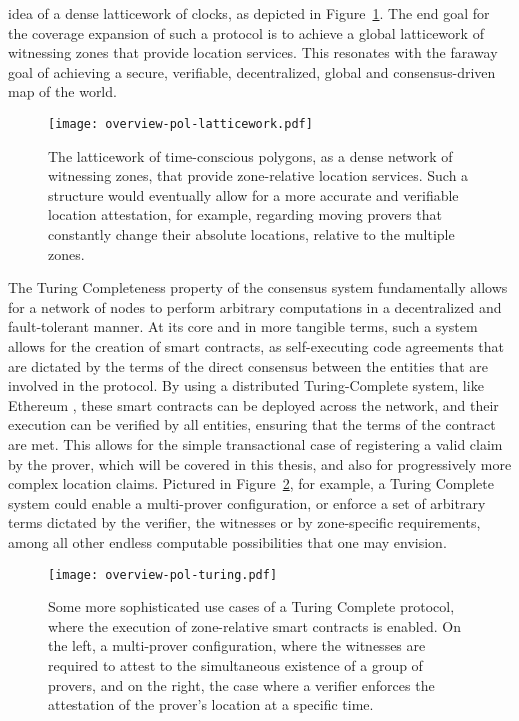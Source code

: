 idea of a dense latticework of clocks, as depicted in Figure~\ref{fig:proof-of-location-overview-latticework}. The end goal for the coverage expansion of such a \pol{} protocol is to achieve a global latticework of witnessing zones that provide location services. This resonates with the faraway goal of achieving a secure, verifiable, decentralized, global and consensus-driven map of the world.

\begin{figure}[ht]
    \begin{center}
    \texttt{[image: overview-pol-latticework.pdf]}
    \caption{The latticework of time-conscious polygons, as a dense network of witnessing zones, that provide zone-relative location services. Such a structure would eventually allow for a more accurate and verifiable location attestation, for example, regarding moving provers that constantly change their absolute locations, relative to the multiple zones.}
    \label{fig:proof-of-location-overview-latticework}
    \end{center}
\end{figure}

The Turing Completeness property of the consensus system fundamentally allows for a network of nodes to perform arbitrary computations in a decentralized and fault-tolerant manner. At its core and in more tangible terms, such a system allows for the creation of smart contracts, as self-executing code agreements that are dictated by the terms of the direct consensus between the entities that are involved in the \pol{} protocol. By using a distributed Turing-Complete system, like Ethereum \cite{buterin2014next}, these smart contracts can be deployed across the network, and their execution can be verified by all entities, ensuring that the terms of the contract are met. This allows for the simple transactional case of registering a valid \pol{} claim by the prover, which will be covered in this thesis, and also for progressively more complex location claims. Pictured in Figure~\ref{fig:proof-of-location-overview-turing}, for example, a Turing Complete system could enable a multi-prover configuration, or enforce a set of arbitrary terms dictated by the verifier, the witnesses or by zone-specific requirements, among all other endless computable possibilities that one may envision. 

\begin{figure}[ht]
    \begin{center}
    \texttt{[image: overview-pol-turing.pdf]}
    \caption{Some more sophisticated use cases of a Turing Complete \pol{} protocol, where the execution of zone-relative smart contracts is enabled. On the left, a multi-prover configuration, where the witnesses are required to attest to the simultaneous existence of a group of provers, and on the right, the case where a verifier enforces the attestation of the prover's location at a specific time.}
    \label{fig:proof-of-location-overview-turing}
    \end{center}
\end{figure}

